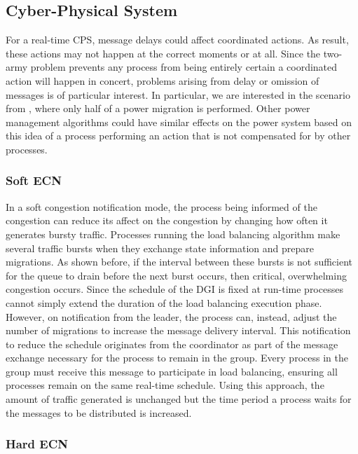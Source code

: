 \subsection{Cyber-Physical System}

For a real-time \ac{CPS}, message delays could affect coordinated actions.
As result, these actions may not happen at the correct moments or at all.
Since the two-army problem prevents any process from being entirely certain a coordinated action will happen in concert, problems arising from delay or omission of messages is of particular interest.
In particular, we are interested in the scenario from \cite{HARINI}, where only half of a power migration is performed.
Other power management algorithms could have similar effects on the power system based on this idea of a process performing an action that is not compensated for by other processes.

\subsubsection{Soft \ac{ECN}}

In a soft congestion notification mode, the process being informed of the congestion can reduce its affect on the congestion by changing how often it generates bursty traffic.
Processes running the load balancing algorithm make several traffic bursts when they exchange state information and prepare migrations.
As shown before, if the interval between these bursts is not sufficient for the queue to drain before the next burst occurs, then critical, overwhelming congestion occurs.
Since the schedule of the \ac{DGI} is fixed at run-time processes cannot simply extend the duration of the load balancing execution phase.
However, on notification from the leader, the process can, instead, adjust the number of migrations to increase the message delivery interval.
This notification to reduce the schedule originates from the coordinator as part of the message exchange necessary for the process to remain in the group.
Every process in the group must receive this message to participate in load balancing, ensuring all processes remain on the same real-time schedule.
Using this approach, the amount of traffic generated is unchanged but the time period a process waits for the messages to be distributed is increased.

\subsubsection{Hard \ac{ECN}}

